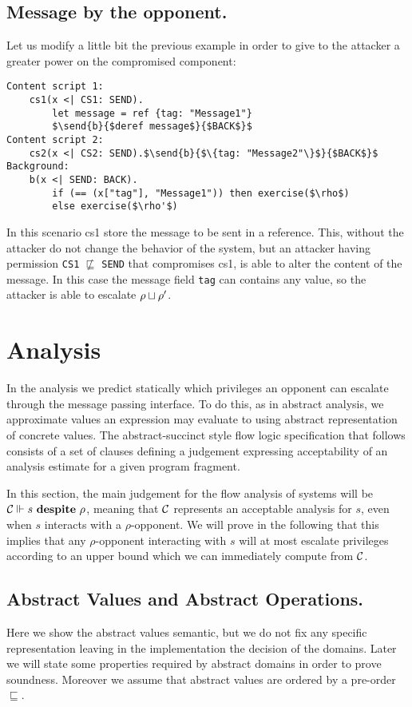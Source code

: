 \subsection{Message by the opponent.}
\label{subs:MessByOpp}
Let us modify a little bit the previous example in order to give to the attacker a greater power on the compromised component:
\begin{small}
\begin{lstlisting}[mathescape]
Content script 1:
	cs1(x <| CS1: SEND).
		let message = ref {tag: "Message1"}
		$\send{b}{$deref message$}{$BACK$}$ 
Content script 2:
	cs2(x <| CS2: SEND).$\send{b}{$\{tag: "Message2"\}$}{$BACK$}$ 
Background:
	b(x <| SEND: BACK).
		if (== (x["tag"], "Message1")) then exercise($\rho$)
		else exercise($\rho'$)
\end{lstlisting}
\end{small}
In this scenario cs1 store the message to be sent in a reference. This, without the attacker do not change the behavior of the system, but an attacker having permission \texttt{CS1} $\not\sqsubseteq$ \texttt{SEND} that compromises cs1, is able to alter the content of the message. In this case the message field \texttt{tag} can contains any value, so the attacker is able to escalate $\rho \sqcup \rho'$.

\section{Analysis}
\label{sec:Analysis}
In the analysis we predict statically which privileges an opponent can escalate through the message passing interface. To do this, as in abstract analysis, we approximate values an expression may evaluate to using abstract representation of concrete values.
The abstract-succinct style flow logic specification that follows consists of a set of clauses defining a judgement expressing acceptability of an analysis estimate for a given program fragment.

In this section, the main judgement for the flow analysis of systems
will be ${\cal C}\Vdash s \ \mathbf{despite}\ \rho$, meaning that ${\cal C}$ represents
an acceptable analysis for $s$, even when $s$ interacts with a $\rho$-opponent.
We will prove in the following that this implies that any $\rho$-opponent
interacting with $s$ will at most escalate privileges according to an
upper bound which we can immediately compute from ${\cal C}$.

\subsection{Abstract Values and Abstract Operations.} 
Here we show the abstract values semantic, but we do not fix any specific representation leaving in the implementation the decision of the domains. Later we will state some properties required by abstract domains in order to prove soundness. Moreover we assume that abstract values are ordered by a pre-order $\sqsubseteq$.

